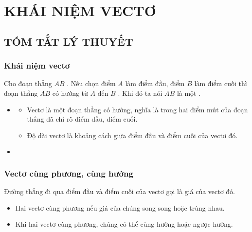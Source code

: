 \setcounter{section}{6}
\section{KHÁI NIỆM VECTƠ}
\subsection{TÓM TẮT LÝ THUYẾT}
\subsubsection{Khái niệm vectơ}
Cho đoạn thẳng $AB$ . Nếu chọn điểm $A$  làm điểm đầu, điểm  $B$ làm điểm cuối thì đoạn thẳng $AB$  có hướng từ $A$  đến $B$ . Khi đó ta nói  $AB$ là một .
\begin{itemize}
	\item[\iconMT] 
	      \begin{itemize}
		      \item  Vectơ là một đoạn thẳng có hướng, nghĩa là trong hai điểm mút của đoạn thẳng đã chỉ rõ điểm đầu, điểm cuối.
		      \item  Độ dài vectơ là khoảng cách giữa điểm đầu và điểm cuối của vectơ đó.
	      \end{itemize}
	\item[\iconMT]
\end{itemize}

\subsubsection{Vectơ cùng phương, cùng hướng}
Đường thẳng đi qua điểm đầu và điểm cuối của vectơ gọi là giá của vectơ đó.
\begin{itemize}
	\item[\iconMT] Hai vectơ cùng phương nếu giá của chúng song song hoặc trùng nhau.
	\item[\iconMT] Khi hai vectơ cùng phương, chúng có thể cùng hướng hoặc ngược hướng.
\end{itemize}
